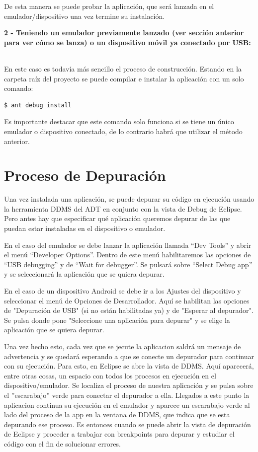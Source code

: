     De esta manera se puede probar la aplicación, que será lanzada en el emulador/dispositivo una vez termine su instalación. 

	\textbf{2 - Teniendo un emulador previamente lanzado (ver sección anterior para ver cómo se lanza) o un dispositivo móvil ya conectado por USB:} \
	
	En este caso es todavía más sencillo el proceso de construcción. Estando en la carpeta raíz del proyecto se puede compilar e instalar la aplicación con un solo comando:

 	 \begin{lstlisting}[style=console, numbers=none]
		$ ant debug install
	\end{lstlisting}	
 	 
 	 Es importante destacar que este comando solo funciona si se tiene un único emulador o dispositivo conectado, de lo contrario habrá que utilizar el método anterior. 

    
\section{Proceso de Depuración} \label{sec:debug}
    
    Una vez instalada una aplicación, se puede depurar su código en ejecución usando la herramienta DDMS del ADT en conjunto con la vista de Debug de Eclipse. Pero antes hay que especificar qué aplicación queremos depurar de las que puedan estar instaladas en el dispositivo o emulador. 

En el caso del emulador se debe lanzar la aplicación llamada “Dev Tools” y abrir el menú “Developer Options”. Dentro de este menú habilitaremos las opciones de “USB debugging” y de  “Wait for debugger”. Se pulsará sobre “Select Debug app” y se seleccionará la aplicación que se quiera depurar. 

En el caso de un dispositivo Android se debe ir a los Ajustes del dispositivo y seleccionar el menú de Opciones de Desarrollador. Aquí se habilitan las opciones de "Depuración de USB"  (si no están habilitadas ya) y de "Esperar al depurador". Se pulsa donde pone "Seleccione una aplicación para depurar" y se elige la aplicación que se quiera depurar. 

Una vez hecho esto, cada vez que se jecute la aplicacion saldrá un mensaje de advertencia y se quedará esperando a que se conecte un depurador para continuar con su ejecución. Para esto, en Eclipse se abre la vista de DDMS. Aquí aparecerá, entre otras cosas, un espacio con todos los procesos en ejecución en el dispositivo/emulador. Se localiza el proceso de nuestra aplicación y se pulsa sobre el ''escarabajo'' verde para conectar el depurador a ella. Llegados a este punto la aplicacion continua su ejecución en el emulador y aparece un escarabajo verde al lado del proceso de la app en la ventana de DDMS, que indica que se esta depurando ese proceso. Es entonces cuando se puede abrir la vista de depuración de Eclipse y proceder a trabajar con breakpoints para depurar y estudiar el código con el fin de solucionar errores.


